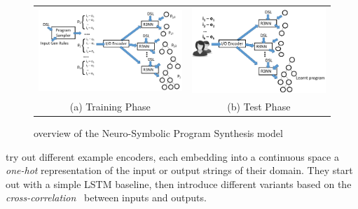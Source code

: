 \documentclass{article}
\begin{document}
\begin{figure}[h]
    \begin{tabular}{c|c}
        \begin{minipage}{0.5\linewidth}
            \includegraphics[scale=0.3]{figures/nsps_training.pdf}
        \end{minipage}
        &
        \begin{minipage}{0.5\linewidth}
            \includegraphics[scale=0.3]{figures/nsps_test.pdf}
        \end{minipage}
        \\
        (a) Training Phase & (b) Test Phase
    \end{tabular}
    \caption{overview of the Neuro-Symbolic Program Synthesis model~\citep{nsps}}
    \label{nsps}
\end{figure}

\citet{nsps} try out different example encoders,
each embedding into a continuous space a \emph{one-hot} representation of the input or output strings of their domain.
They start out with a simple LSTM baseline,
then introduce different variants based on the \emph{cross-correlation}~\citep{bracewell1986fourier} between inputs and outputs.
\end{document}
